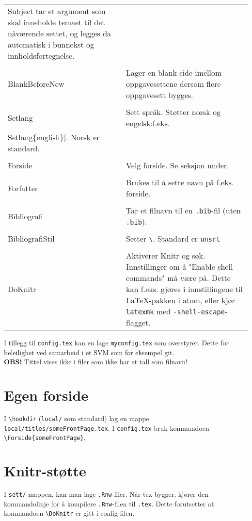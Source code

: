 \documentclass{article}
\begin{document}
\begin{tabularx}{\textwidth}{lX}
												Subject tar et argument som skal inneholde temaet til det nåværende settet, og legges da automatisk i bunnekst og innholdsfortegnelse.\\
	\lstinline{\\BlankBeforeNew}&Lager en blank side imellom oppgavesettene dersom flere oppgavesett bygges.\\
	\lstinline{\\Setlang}&Sett språk. Støtter norsk og engelsk:f.eks. \lstinline|\\Setlang\{english\}|. Norsk er standard.\\
	\lstinline{\\Forside}&Velg forside. Se seksjon under.\\
	\lstinline{\\Forfatter}&Brukes til å sette navn på f.eks. forside.\\
	\lstinline{\\Bibliografi}&Tar et filnavn til en \lstinline{.bib}-fil (uten \lstinline{.bib}).\\
	\lstinline{\\BibliografiStil}&Setter \lstinline{\}. Standard er \lstinline{unsrt}\\
	\lstinline{\\DoKnitr}&Aktiverer Knitr og søk. Innstillinger om å "Enable shell commands" må være på. Dette kan f.eks. gjøres i innstillingene til \LaTeX-pakken i atom, eller kjør \lstinline{latexmk} med \lstinline{-shell-escape}-flagget.
\end{tabularx}
I tillegg til \lstinline{config.tex} kan en lage \lstinline{myconfig.tex} som overstyrer. Dette for beleilighet ved samarbeid i et SVM som for eksempel git.\\
\textbf{OBS!} Tittel vises ikke i filer som ikke har et tall som filnavn!
\clearpage
\section*{Egen forside}
I \lstinline{\hookdir} (\lstinline{local/} som standard) lag en mappe \lstinline{local/titles/someFrontPage.tex}.
I \lstinline{config.tex} bruk kommandoen \lstinline|\Forside{someFrontPage}|.
\section*{Knitr-støtte}
I \lstinline{sett/}-mappen, kan man lage \lstinline{.Rnw}-filer. Når tex bygger, kjører den kommandolinje for å kompilere \lstinline{.Rnw}-filen til \lstinline{.tex}.
Dette forutsetter at kommandoen \lstinline{\DoKnitr} er gitt i config-filen.
\end{document}
